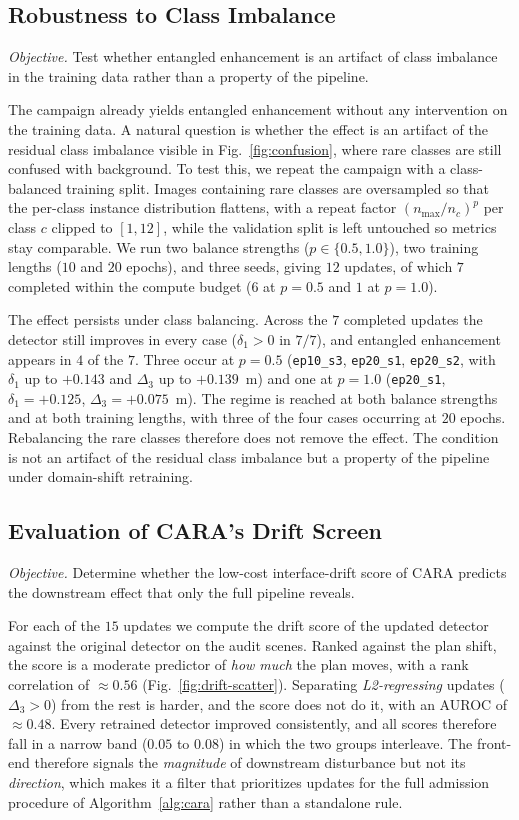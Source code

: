 \documentclass[conference]{IEEEtran}
\begin{document}
\subsection{Robustness to Class Imbalance}
\label{sec:res-balanced}
\emph{Objective.} Test whether entangled enhancement is an artifact of class
imbalance in the training data rather than a property of the pipeline.

The campaign already yields entangled enhancement without any intervention on the
training data. A natural question is whether the effect is an artifact of the
residual class imbalance visible in Fig.~\ref{fig:confusion}, where rare classes
are still confused with background. To test this, we repeat the campaign with a
class-balanced training split. Images containing rare classes are oversampled so
that the per-class instance distribution flattens, with a repeat factor
$(n_{\max}/n_c)^{p}$ per class $c$ clipped to
$[1,12]$, while the validation split is left untouched so metrics stay comparable.
We run two balance strengths ($p \in \{0.5, 1.0\}$), two training lengths
($10$ and $20$ epochs), and three seeds, giving $12$ updates, of which $7$
completed within the compute budget ($6$ at $p{=}0.5$ and $1$ at $p{=}1.0$).

The effect persists under class balancing. Across the $7$ completed updates the
detector still improves in every case ($\delta_1 > 0$ in $7/7$), and entangled
enhancement appears in $4$ of the $7$. Three occur at $p{=}0.5$
(\texttt{ep10\_s3}, \texttt{ep20\_s1}, \texttt{ep20\_s2}, with $\delta_1$ up to
$+0.143$ and $\Delta_3$ up to $+0.139$~m) and one at $p{=}1.0$
(\texttt{ep20\_s1}, $\delta_1{=}+0.125$, $\Delta_3{=}+0.075$~m). The regime is reached at
both balance strengths and at both training lengths, with three of the four cases
occurring at $20$ epochs. Rebalancing the rare classes therefore does not remove
the effect. The condition is
not an artifact of the residual class imbalance but a property of the pipeline
under domain-shift retraining.

\subsection{Evaluation of CARA's Drift Screen}
\label{sec:res-gate}
\emph{Objective.} Determine whether the low-cost interface-drift score of CARA
predicts the downstream effect that only the full pipeline reveals.

For each of the $15$ updates we compute the drift score of the updated detector
against the original detector on the audit scenes. Ranked against the plan shift,
the score is a moderate predictor of \emph{how much} the plan moves, with a rank
correlation of $\approx 0.56$ (Fig.~\ref{fig:drift-scatter}). Separating
\emph{L2-regressing} updates ($\Delta_3 > 0$) from the rest is harder, and the score
does not do it, with an AUROC of $\approx 0.48$. Every retrained detector improved
consistently, and all scores therefore fall in a narrow band ($0.05$ to $0.08$) in which the two
groups interleave. The front-end therefore signals the \emph{magnitude} of
downstream disturbance but not its \emph{direction}, which makes it a filter that
prioritizes updates for the full admission procedure of
Algorithm~\ref{alg:cara} rather than a standalone rule.
\end{document}
